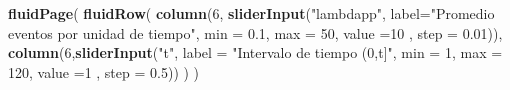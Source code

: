 \documentclass[]{book}
\newenvironment{Shaded}{\begin{snugshade}}{\end{snugshade}}
\newcommand{\DataTypeTok}[1]{\textcolor[rgb]{0.13,0.29,0.53}{#1}}
\newcommand{\DecValTok}[1]{\textcolor[rgb]{0.00,0.00,0.81}{#1}}
\newcommand{\FloatTok}[1]{\textcolor[rgb]{0.00,0.00,0.81}{#1}}
\newcommand{\KeywordTok}[1]{\textcolor[rgb]{0.13,0.29,0.53}{\textbf{#1}}}
\newcommand{\NormalTok}[1]{#1}
\newcommand{\StringTok}[1]{\textcolor[rgb]{0.31,0.60,0.02}{#1}}
\begin{document}
\begin{Shaded}
\begin{Highlighting}[]
\KeywordTok{fluidPage}\NormalTok{(}
  \KeywordTok{fluidRow}\NormalTok{(}
      \KeywordTok{column}\NormalTok{(}\DecValTok{6}\NormalTok{,}
           \KeywordTok{sliderInput}\NormalTok{(}\StringTok{"lambdapp"}\NormalTok{, }\DataTypeTok{label=}\StringTok{"Promedio eventos por unidad de tiempo"}\NormalTok{, }\DataTypeTok{min =} \FloatTok{0.1}\NormalTok{, }\DataTypeTok{max =} \DecValTok{50}\NormalTok{, }\DataTypeTok{value =}\DecValTok{10}\NormalTok{ , }\DataTypeTok{step =} \FloatTok{0.01}\NormalTok{)),}
    \KeywordTok{column}\NormalTok{(}\DecValTok{6}\NormalTok{,}\KeywordTok{sliderInput}\NormalTok{(}\StringTok{"t"}\NormalTok{, }\DataTypeTok{label =} \StringTok{"Intervalo de tiempo (0,t]"}\NormalTok{, }\DataTypeTok{min =} \DecValTok{1}\NormalTok{, }\DataTypeTok{max =} \DecValTok{120}\NormalTok{, }\DataTypeTok{value =}\DecValTok{1}\NormalTok{ , }\DataTypeTok{step =} \FloatTok{0.5}\NormalTok{))}
\NormalTok{   )}
\NormalTok{)}



\end{Highlighting}
\end{Shaded}
\end{document}

